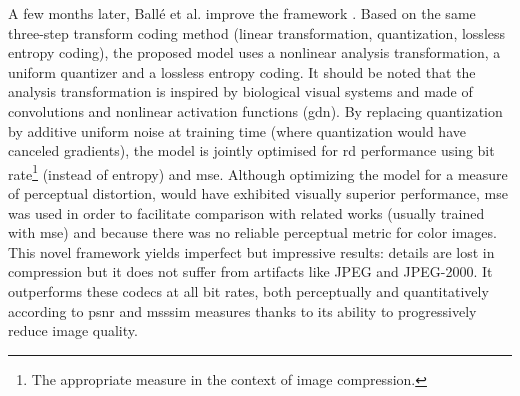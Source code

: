 \documentclass{article}
\begin{document}
A few months later, Ballé et al. improve the framework \cite{balle2017endtoendoptimizedimagecompression}. Based on the same three-step transform coding method (linear transformation, quantization, lossless entropy coding), the proposed model uses a nonlinear analysis transformation, a uniform quantizer and a lossless entropy coding. It should be noted that the analysis transformation is inspired by biological visual systems and made of convolutions and nonlinear activation functions (\acrshort{gdn}). By replacing quantization by additive uniform noise at training time (where quantization would have canceled gradients), the model is jointly optimised for \acrshort{rd} performance using bit rate\footnote{The appropriate measure in the context of image compression.} (instead of entropy) and \acrshort{mse}. Although optimizing the model for a measure of perceptual distortion, would have exhibited visually superior performance, \acrshort{mse} was used in order to facilitate comparison with related works (usually trained with \acrshort{mse}) and because there was no reliable perceptual metric for color images. This novel framework yields imperfect but impressive results: details are lost in compression but it does not suffer from artifacts like JPEG and JPEG-2000. It outperforms these codecs at all bit rates, both perceptually and quantitatively according to \acrshort{psnr} and \acrshort{msssim} measures thanks to its ability to progressively reduce image quality.
\end{document}
